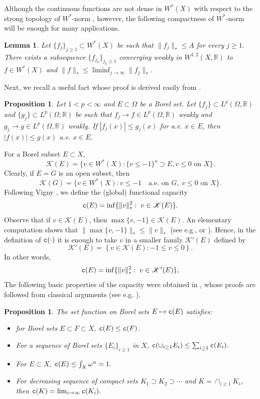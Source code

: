 \documentclass{amsart}
\newcommand{\om}{\omega}
\newcommand{\tc}{{\tt c}}
\newcommand{\Om}{\Omega}
\newcommand{\bR}{\mathbb{R}}
\newcommand{\cali}[1]{\mathscr{#1}}
\newcommand{\Kc}{\cali{K}}
\newtheorem{prop}[thm]{Proposition}
\newtheorem{lem}[thm]{Lemma}
\theoremstyle{definition}
\numberwithin{thm}{section}
\numberwithin{equation}{section}
\renewcommand{\[}{\begin{equation}}
\renewcommand{\]}{\end{equation}}
\begin{document}
Although the continuous functions are not dense in $W^*(X)$ with respect to the strong topology of $W^*$-norm \cite[Proposition~7]{Vigny}, however, 
the following compactness \cite[Proposition~4]{Vigny} of $W^*$-norm will be enough for many applications.
\begin{lem} \label{lem:w-compactness}  Let $\{f_j \}_{j\geq 1} \subset W^*(X)$ be such that $\|f_j \|_* \leq A$ for every $j\geq 1$. There exists a subsequence $\{f_{j_k} \}_{j_k \geq 1}$ converging weakly in $W^{1,2}(X,\bR)$ to $f \in W^*(X)$  and $\|f\|_* \leq \liminf_{j\to \infty} \|f_j\|_*$.
\end{lem}

Next, we recall a useful fact whose  proof  is derived easily from \cite[Theorem~2.35]{KLV-book}. 
\begin{prop}  \label{prop:weak-conv-cp} Let $1<p<\infty$ and $E \subset \Om$ be a Borel set.  Let $\{f_j\} \subset L^p(\Om, \bR)$ and $\{g_j\} \subset L^p(\Om,\bR)$ be such that  $f_j \to f \in L^p(\Om,\bR)$ weakly and $g_j \to g\in L^p(\Om,\bR)$ weakly. 
If $|f_j(x)| \leq g_j(x)$ for a.e. $x\in E$, then $|f(x)| \leq g(x)$ a.e. $x\in E$. 
\end{prop}



For a Borel subset $E \subset X$, 
$$
	\Kc(E) = \{v \in W^*(X): \{v \leq -1\}^o \supset  E, v \leq 0 \text{ on }X \}.
$$
Clearly, if $E = G$ is an open subset, then 
$$
	\Kc(G) = \{v \in W^*(X): v \leq -1 \quad \text{a.e. on } G, \; v \leq 0 \text{ on }X \}.
$$
Following Vigny \cite{Vigny}, we define the (global) functional capacity 
\[\label{eq:w-cap}
	\tc(E) = \inf \{ \|v\|_*^2: \; v \in \Kc(E)\}.
\]
Observe that  if $v\in \Kc(E)$, then $\max\{v,-1\} \in \Kc(E)$. An elementary computation shows that $\| \max\{v,-1\} \|_* \leq \|v\|_*$ (see e.g., \cite{Vigny} or \cite{DMV}). Hence, 
in the definition of  $\tc(\cdot)$ it is enough to take $v$ in a smaller family $\Kc'(E)$ defined by
$$
	\Kc'(E) = \left\{ v\in \Kc(E): -1 \leq v \leq 0\right\}.
$$
In other words,
\[\label{eq:w-cap-use}
	\tc(E) = \inf \{ \|v\|_*^2: \; v \in \Kc'(E)\}, 
\]
The following basic properties of the capacity were obtained in \cite[Proposition~27]{Vigny}, whose proofs  are followed from classical arguments (see e.g. \cite{AH96}).

\begin{prop} \label{prop:w-cap-basic-p} The set function on Borel sets $E \mapsto \tc(E)$ satisfies:
\begin{itemize}
\item
[(a)] for Borel sets $E \subset F \subset X$, $\tc(E) \leq \tc (F)$.
\item
[(b)] For a sequence of Borel sets $\{E_i\}_{i\geq 1}$ in $X$, 
$
	\tc (\cup_{i\geq 1} E_i) \leq \sum_{i\geq 1} \tc (E_i).
$
\item[(c)] For $E \subset X$, $\tc(E) \leq \int_X \om^n =1.$
\item
[(d)] For decreasing sequence of compact sets $K_1 \supset K_2 \supset \cdots$ and $K= \cap_{i\geq 1} K_i$, then 
$\tc(K)  = \lim_{i\to \infty} \tc(K_i).$
\end{itemize}
\end{prop}
\end{document}
